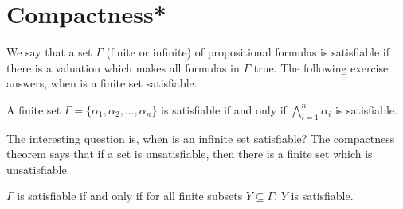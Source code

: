 \section{Compactness*}
We say that a set $\Gamma$ (finite or infinite) of propositional formulas is satisfiable if there is a valuation which makes all formulas in $\Gamma$ true. The following exercise answers, when is a finite set satisfiable.
\begin{exercise}
A finite set $\Gamma = \{\alpha_1,\alpha_2,\dots,\alpha_n\}$ is satisfiable if and only if $\bigwedge_{i=1}^n \alpha_i$ is satisfiable.
\end{exercise}
The interesting question is, when is an infinite set satisfiable? The compactness theorem says that if a set is unsatisfiable, then there is a finite set which is unsatisfiable. 
\begin{theorem}[Compactness]
\label{thm:propCompactness}
$\Gamma$ is satisfiable if and only if for all finite subsets $Y \subseteq \Gamma$, $Y$ is satisfiable.
\end{theorem}
